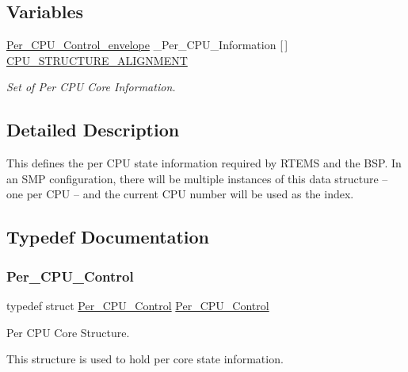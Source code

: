 \subsection*{Variables}
\begin{DoxyCompactItemize}
\item 
\mbox{\hyperlink{structPer__CPU__Control__envelope}{Per\+\_\+\+C\+P\+U\+\_\+\+Control\+\_\+envelope}} \+\_\+\+Per\+\_\+\+C\+P\+U\+\_\+\+Information \mbox{[}$\,$\mbox{]} \mbox{\hyperlink{group__PerCPU_ga0d4329f03b0319134ca2c192f96f4e5a}{C\+P\+U\+\_\+\+S\+T\+R\+U\+C\+T\+U\+R\+E\+\_\+\+A\+L\+I\+G\+N\+M\+E\+NT}}
\begin{DoxyCompactList}\small\item\em Set of Per C\+PU Core Information. \end{DoxyCompactList}\end{DoxyCompactItemize}


\subsection{Detailed Description}
This defines the per C\+PU state information required by R\+T\+E\+MS and the B\+SP. In an S\+MP configuration, there will be multiple instances of this data structure -- one per C\+PU -- and the current C\+PU number will be used as the index. 

\subsection{Typedef Documentation}
\mbox{\label{group__PerCPU_ga206935ee396e0bd5bedf80098a07578b}} 
\subsubsection{\texorpdfstring{Per\_CPU\_Control}{Per\_CPU\_Control}}
{\footnotesize\ttfamily typedef struct \mbox{\hyperlink{structPer__CPU__Control}{Per\+\_\+\+C\+P\+U\+\_\+\+Control}}  \mbox{\hyperlink{structPer__CPU__Control}{Per\+\_\+\+C\+P\+U\+\_\+\+Control}}}



Per C\+PU Core Structure. 

This structure is used to hold per core state information. 

